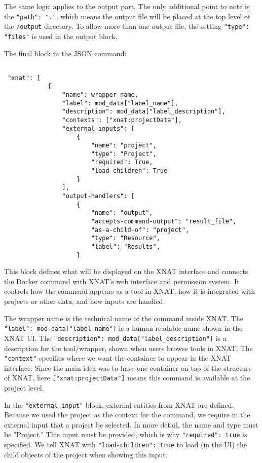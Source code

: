 The same logic applies to the output part. The only additional point to note is the \texttt{"path": "."}, which means the output file will be placed at the top level of the \texttt{/output} directory. To allow more than one output file, the setting \texttt{"type": "files"} is used in the output block.

The final block in the JSON command:

\begin{lstlisting}

 "xnat": [
            {
                "name": wrapper_name,
                "label": mod_data["label_name"],
                "description": mod_data["label_description"],
                "contexts": ["xnat:projectData"],  
                "external-inputs": [
                    { 
                        "name": "project",
                        "type": "Project",
                        "required": True,
                        "load-children": True
                    }
                ],
                "output-handlers": [
                    {
                        "name": "output",
                        "accepts-command-output": "result_file",
                        "as-a-child-of": "project",
                        "type": "Resource",
                        "label": "Results",
                    }
\end{lstlisting}

This block defines what will be displayed on the XNAT interface and connects the Docker command with XNAT's web interface and permission system. It controls how the command appears as a tool in XNAT, how it is integrated with projects or other data, and how inputs are handled.

The wrapper name is the technical name of the command inside XNAT. The \texttt{"label": mod\_data["label\_name"]} is a human-readable name shown in the XNAT \ac{UI}. The \texttt{"description": mod\_data["label\_description"]} is a description for the tool/wrapper, shown when users browse tools in XNAT. The \texttt{"context"} specifies where we want the container to appear in the XNAT interface. Since the main idea was to have one container on top of the structure of XNAT, here \texttt{["xnat:projectData"]} means this command is available at the project level.


In the \texttt{"external-input"} block, external entities from XNAT are defined. Because we used the project as the context for the command, we require in the external input that a project be selected. In more detail, the name and type must be "Project." This input must be provided, which is why \texttt{"required": true} is specified. We tell XNAT with \texttt{"load-children": true} to load (in the UI) the child objects of the project when showing this input.

